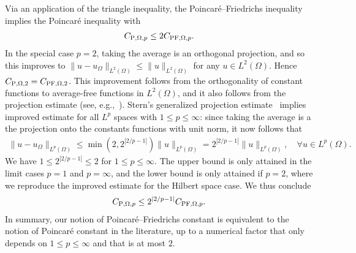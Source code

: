\documentclass[10pt,letterpaper]{article}
\begin{document}
Via an application of the triangle inequality, 
the Poincar\'e--Friedrichs inequality implies the Poincar\'e inequality with 
\begin{align*}
    C_{{\rm P},\Omega,p} \leq 2 C_{{\rm PF},\Omega,p}.
\end{align*}
In the special case $p=2$, taking the average is an orthogonal projection, and so this improves to $\| u - u_\Omega \|_{L^{2}(\Omega)} \leq \| u \|_{L^{2}(\Omega)}$ for any $u \in L^{2}(\Omega)$. Hence $C_{{\rm P},\Omega,2} = C_{{\rm PF},\Omega,2}$. 
This improvement follows from the orthogonality of constant functions to average-free functions in $L^2(\Omega)$,
and it also follows from the projection estimate (see, e.g.,~\cite{xu2003some}).
Stern's generalized projection estimate~\cite[Theorem~4.1,Remark~5.1]{stern2015banach} implies improved estimate for all $L^{p}$ spaces with $1 \leq p \leq \infty$:
since taking the average is a the projection onto the constants functions with unit norm, it now follows that 
\begin{align*}
    \| u - u_\Omega \|_{L^{p}(\Omega)}
    \leq 
    \min\left( 2, 2^{|2/p-1|} \right)
    \| u \|_{L^{p}(\Omega)}
    = 
    2^{|2/p-1|} 
    \| u \|_{L^{p}(\Omega)}
    ,
    \quad 
    \forall 
    u \in L^{p}(\Omega)
    .
\end{align*}
We have $1 \leq 2^{|2/p-1|} \leq 2$ for $1 \leq p \leq \infty$.
The upper bound is only attained in the limit cases $p = 1$ and $p = \infty$, and the lower bound is only attained if $p = 2$, where we reproduce the improved estimate for the Hilbert space case.
We thus conclude 
\begin{align}\label{math:p_vs_pf}
    C_{{\rm P},\Omega,p} \leq 2^{|2/p-1|} C_{{\rm PF},\Omega,p}.
\end{align}
In summary, our notion of Poincar\'e--Friedrichs constant is equivalent to the notion of Poincar\'e constant in the literature, up to a numerical factor that only depends on $1 \leq p \leq \infty$ and that is at most $2$.
\\
\end{document}
